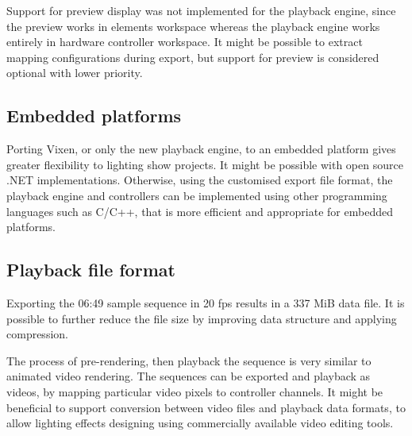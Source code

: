 \documentclass[journal]{IEEEtran}
\begin{document}
Support for preview display was not implemented for the playback engine, since the preview works in elements workspace whereas the playback engine works entirely in hardware controller workspace. It might be possible to extract mapping configurations during export, but support for preview is considered optional with lower priority.

\subsection{Embedded platforms}

Porting Vixen, or only the new playback engine, to an embedded platform gives greater flexibility to lighting show projects. It might be possible with open source .NET implementations. Otherwise, using the customised export file format, the playback engine and controllers can be implemented using other programming languages such as C/C++, that is more efficient and appropriate for embedded platforms.

\subsection{Playback file format}

Exporting the 06:49 sample sequence in 20 fps results in a 337 MiB data file. It is possible to further reduce the file size by improving data structure and applying compression.

The process of pre-rendering, then playback the sequence is very similar to animated video rendering. The sequences can be exported and playback as videos, by mapping particular video pixels to controller channels. It might be beneficial to support conversion between video files and playback data formats, to allow lighting effects designing using commercially available video editing tools.




\end{document}
